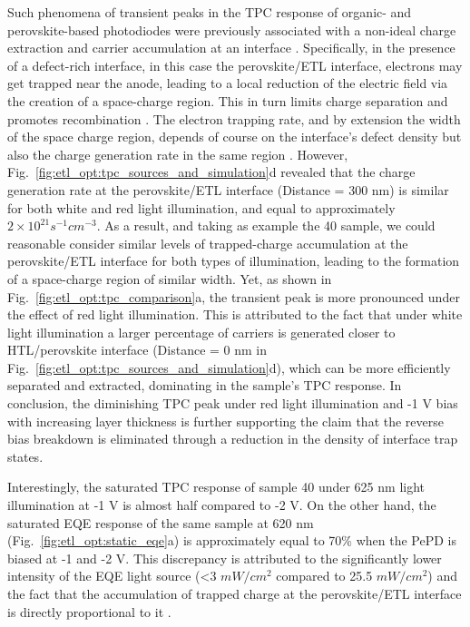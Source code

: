 Such phenomena of transient peaks in the TPC response of organic- and perovskite-based photodiodes were previously associated with a non-ideal charge extraction and carrier accumulation at an interface \cite{Neophytou2019EnhancingLayer, Hwang2009Drift-diffusionCells,Mcneill2009PhotocurrentEffects}. Specifically, in the presence of a defect-rich interface, in this case the perovskite/ETL interface, electrons may get trapped near the anode, leading to a local reduction of the electric field via the creation of a space-charge region. This in turn limits charge separation and promotes recombination \cite{Mcneill2009PhotocurrentEffects}. The electron trapping rate, and by extension the width of the space charge region, depends of course on the interface's defect density but also the charge generation rate in the same region \cite{Hwang2009Drift-diffusionCells}. However, Fig.~\ref{fig:etl_opt:tpc_sources_and_simulation}d revealed that the charge generation rate at the perovskite/ETL interface (Distance = 300 nm) is similar for both white and red light illumination, and equal to approximately $2\times 10^{21}s^{-1}cm^{-3}$. As a result, and taking as example the 40 sample, we could reasonable consider similar levels of trapped-charge accumulation at the perovskite/ETL interface for both types of illumination, leading to the formation of a space-charge region of similar width. Yet, as shown in Fig.~\ref{fig:etl_opt:tpc_comparison}a, the transient peak is more pronounced under the effect of red light illumination. This is attributed to the fact that under white light illumination a larger percentage of carriers is generated closer to HTL/perovskite interface (Distance = 0 nm in Fig.~\ref{fig:etl_opt:tpc_sources_and_simulation}d), which can be more efficiently separated and extracted, dominating in the sample's TPC response. In conclusion, the diminishing TPC peak under red light illumination and -1 V bias with increasing  layer thickness is further supporting the claim that the reverse bias breakdown is eliminated through a reduction in the density of interface trap states.

Interestingly, the saturated TPC response of sample 40 under 625 nm light illumination at -1 V is almost half compared to -2 V. On the other hand, the saturated EQE response of the same sample at 620 nm (Fig.~\ref{fig:etl_opt:static_eqe}a) is approximately equal to 70\% when the PePD is biased at -1 and -2 V. This discrepancy is attributed to the significantly lower intensity of the EQE light source (<3 $mW/cm^2$ compared to 25.5 $mW/cm^2$) and the fact that the accumulation of trapped charge at the perovskite/ETL interface is directly proportional to it \cite{Hwang2009Drift-diffusionCells,Mcneill2009PhotocurrentEffects}.

